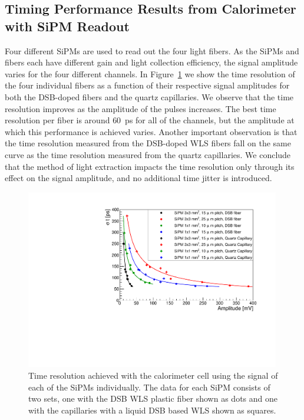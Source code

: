\subsection{Timing Performance Results from Calorimeter with SiPM Readout}
\label{sec:beamtiming}

Four different SiPMs are used to read out the four light fibers. As the SiPMs
and fibers each have different gain and light collection efficiency, the signal
amplitude varies for the four different channels. In Figure~\ref{TimeResolution}
we show the time resolution of the four individual fibers as a function of their
respective signal amplitudes for both the DSB-doped fibers and the quartz
capillaries. We observe that the time resolution improves as the amplitude of
the pulses increases. The best time resolution per fiber is around $60$~ps for
all of the channels, but the amplitude at which this performance is achieved
varies. Another important observation is that the time resolution measured from
the DSB-doped WLS fibers fall on the same curve as the time resolution measured
from the quartz capillaries. We conclude that the method of light extraction
impacts the time resolution only through its effect on the signal amplitude, and
no additional time jitter is introduced. 


\begin{figure}[!htb]
\centering
\includegraphics[width=0.99\textwidth]{figures/ShashlikTimeResolution.pdf}
\caption{\label{TimeResolution} Time resolution achieved with the calorimeter cell using the signal of each 
of the  SiPMs individually. The data for each SiPM consists of two sets, one with the DSB WLS plastic fiber shown as 
dots and one with the capillaries with a liquid DSB based WLS shown as squares. }
\end{figure}



